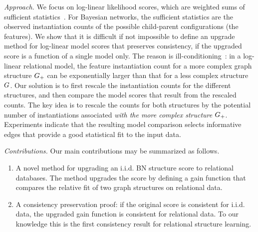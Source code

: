 \documentclass[letterpaper]{article}
\begin{document}

\emph{Approach.} We focus on log-linear likelihood scores, which are weighted sums of sufficient statistics~\cite{Sutton2007,Kimmig2014}. For Bayesian networks, the sufficient statistics are the observed instantiation counts of the possible child-parent configurations (the features). We show that it is difficult if not impossible to define an upgrade method for log-linear model scores that preserves consistency, if the upgraded score is a function of a single model only.
The reason is ill-conditioning~\cite{Lowd2007}: in a log-linear relational model, the feature instantiation count for a more complex graph structure $G_{+}$ can be exponentially larger than that for a less complex structure $G$. Our solution is to first rescale the instantiation counts for the different structures, and then compare the model scores that result from the rescaled counts. The key idea is to rescale the counts for both structures by the potential number of instantiations associated {\em with the more complex structure} $G_{+}$. Experiments indicate that the resulting model comparison selects informative edges that provide a good statistical fit to the input data.




\emph{Contributions.} Our main contributions may be summarized as follows.

\begin{enumerate}
\item A novel method for upgrading an i.i.d. BN structure score to relational databases. The method upgrades the score by defining a gain function that compares the relative fit of two graph structures on relational data.
\item A consistency preservation proof: if the original score is consistent for i.i.d. data, the upgraded gain function is consistent for relational data. To our knowledge this is the first consistency result for relational structure learning.
\end{enumerate}
\end{document}
